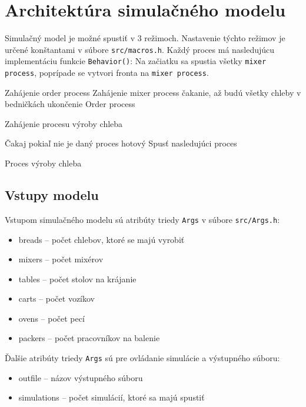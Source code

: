 \documentclass[a4paper, 10pt]{article}
\begin{document}
    \section{Architektúra simulačného modelu}
    Simulačný model\cite[slide 44]{IMS_slides} je možné spustiť v 3 režimoch. Nastavenie týchto
    režimov je určené konštantami v súbore \texttt{src/macros.h}.
    Každý proces má nasledujúcu implementáciu funkcie \texttt{Behavior()}:
    Na začiatku sa spustia všetky \texttt{mixer process}, poprípade se vytvori fronta na \texttt{mixer process}.

    \begin{algorithm}[ht]

        Zahájenie order process\;
        {
            Zahájenie mixer process\;
        }
        čakanie, až budú všetky chleby v bedničkách\;
        ukončenie Order process\;

        \caption{Zahájenie procesu výroby chleba}
        \label{algorithm:orderprocess}
    \end{algorithm}

    \begin{algorithm}[ht]
        Čakaj pokiaľ nie je daný proces hotový\;
        Spusť nasledujúci proces\;
        \caption{Proces výroby chleba}
        \label{algorithm:otherprocess}
    \end{algorithm}

    \subsection{Vstupy modelu}
    Vstupom simulačného modelu sú atribúty triedy \texttt{Args} v súbore \texttt{src/Args.h}:
    \begin{itemize}
        \item breads -- počet chlebov, ktoré se majú vyrobiť
        \item mixers -- počet mixérov
        \item tables -- počet stolov na krájanie
        \item carts -- počet vozíkov
        \item ovens -- počet pecí
        \item packers -- počet pracovníkov na balenie
    \end{itemize}

    Ďalšie atribúty triedy \texttt{Args} sú pre ovládanie simulácie a výstupného súboru:
    \begin{itemize}
        \item outfile -- názov výstupného súboru
        \item simulations -- počet simulácií, ktoré sa majú spustiť
    \end{itemize}
\end{document}

